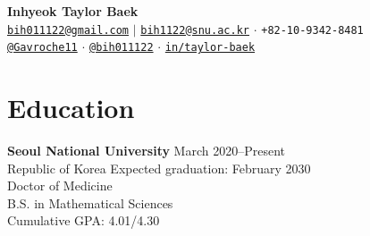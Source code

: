 \documentclass[10pt, a4paper]{article}
\begin{document}
\begin{center}
    {\Large\textbf{\color{mycolor}Inhyeok Taylor Baek}} \\[2mm]
    \small
    \faEnvelope\hspace{1mm}\href{mailto:bih011122@gmail.com}{\texttt{bih011122@gmail.com}} $\vert$ \href{mailto:bih1122@snu.ac.kr}{\texttt{bih1122@snu.ac.kr}}
    \hspace{2mm}$\cdot$\hspace{2mm}
    \faPhone\hspace{1mm}\texttt{+82-10-9342-8481} \\[1mm]
    \faGithub\hspace{1mm}\href{https://github.com/gavroche11}{\texttt{@Gavroche11}}
    \hspace{2mm}$\cdot$\hspace{2mm}
    {}\hspace{1mm}\href{https://x.com/bih011122}{\texttt{@bih011122}}
    \hspace{2mm}$\cdot$\hspace{2mm}
    \faLinkedin\hspace{1mm}\href{https://www.linkedin.com/in/taylor-baek/}{\texttt{in/taylor-baek}}
\end{center}

\section*{Education}
\textbf{Seoul National University} \hfill March 2020--Present \\
Republic of Korea \hfill Expected graduation: February 2030 \smallskip\\
Doctor of Medicine\\
B.S. in Mathematical Sciences \smallskip\\
Cumulative GPA: 4.01/4.30

\end{document}
